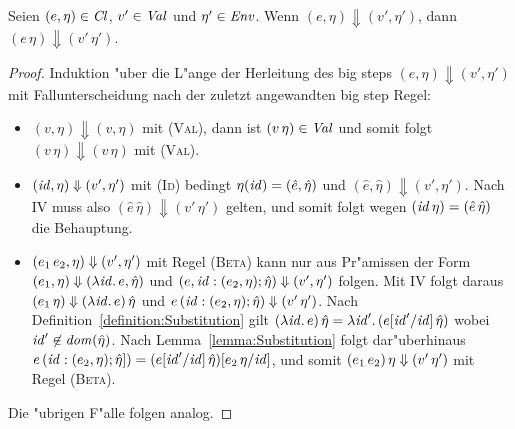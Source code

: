 \documentclass[12pt,fleqn,a4paper]{article}
\newcommand{\RN}[1]{\mbox{\textsc{(#1)}}}
\newcommand{\Cl}{\name{Cl}}
\begin{document}
\begin{theorem} \label{theorem:Korrektheit}
  Seien $(e,\eta) \in \Cl$, $v'\in{\text{\it Val\/}}$ und $\eta'\in{\text{\it Env\/}}$. Wenn $(e,\eta) \Downarrow (v',\eta')$, dann
  $(e\,\eta) \Downarrow (v'\,\eta')$.
\end{theorem}

\begin{proof}
  Induktion "uber die L"ange der Herleitung des big steps $(e,\eta) \Downarrow (v',\eta')$ mit Fallunterscheidung
  nach der zuletzt angewandten big step Regel:
  \begin{itemize}
    \item $(v,\eta) \Downarrow (v,\eta)$ mit \RN{Val}, dann ist $(v\,\eta) \in {\text{\it Val\/}}$ und somit folgt
          $(v\,\eta) \Downarrow (v\,\eta)$ mit \RN{Val}.

    \item $({\text{\it id\/}},\eta) \Downarrow (v',\eta')$ mit \RN{Id} bedingt $\eta({\text{\it id\/}}) = (\hat{e},\hat{\eta})$ und
          $(\hat{e},\hat{\eta}) \Downarrow (v',\eta')$. Nach IV muss also $(\hat{e}\,\hat{\eta})\Downarrow(v'\,\eta')$
          gelten, und somit folgt wegen $({\text{\it id\/}}\,\eta) = (\hat{e}\,\hat{\eta})$ die Behauptung.

    \item $(e_1\,e_2,\eta) \Downarrow (v',\eta')$ mit Regel \RN{Beta} kann nur aus Pr"amissen der Form
          $(e_1,\eta) \Downarrow (\lambda {\text{\it id\/}}.\,e,\hat{\eta})$ und
          $(e,{\text{\it id\/}}:(e_2,\eta);\hat{\eta})\Downarrow(v',\eta')$
          folgen. Mit IV folgt daraus $(e_1\,\eta) \Downarrow (\lambda {\text{\it id\/}}.\,e)\,\hat{\eta}$ und
          $e\,({\text{\it id\/}}:(e_2,\eta);\hat{\eta})\Downarrow(v'\,\eta')$. Nach Definition~\ref{definition:Substitution}
          gilt $(\lambda {\text{\it id\/}}.\,e)\,\hat{\eta} = \lambda {\text{\it id\/}}'.\,(e[{\text{\it id\/}}'/{\text{\it id\/}}]\,\hat{\eta})$ wobei
          ${\text{\it id\/}}'\not\in{\text{\it dom\/}}(\hat{\eta})$. Nach Lemma~\ref{lemma:Substitution} folgt dar"uberhinaus
          $e\,({\text{\it id\/}}:(e_2,\eta);\hat{\eta}]) = (e[{\text{\it id\/}}'/{\text{\it id\/}}]\,\hat{\eta})[e_2\,\eta/{\text{\it id\/}}]$, und somit
          $(e_1\,e_2)\,\eta \Downarrow (v'\,\eta')$ mit Regel \RN{Beta}.

  \end{itemize}
  Die "ubrigen F"alle folgen analog.
\end{proof}
\end{document}
